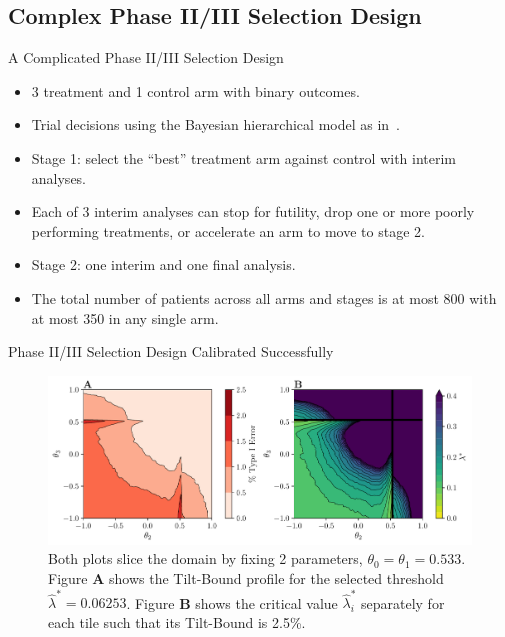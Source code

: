 
\subsection{Complex Phase II/III Selection Design}

\begin{frame}{A Complicated Phase II/III Selection Design}
\begin{itemize}
    \item 3 treatment and 1 control arm with binary outcomes.
    \item Trial decisions using the Bayesian hierarchical model 
        as in~\citet{berry:2013}.
    \item Stage 1: select the ``best'' treatment arm against control
        with interim analyses.
    \item Each of 3 interim analyses can stop for futility,
    drop one or more poorly performing treatments,
    or accelerate an arm to move to stage 2.
    \item Stage 2: one interim and one final analysis. 
    \item The total number of patients across
        all arms and stages is at most 800 with at most 350 in any single arm.
\end{itemize} 
\end{frame}

\begin{frame}{Phase II/III Selection Design Calibrated Successfully}
\begin{figure}
    \centering
    \includegraphics[width=\linewidth]{figs/lewis_tie_lam.pdf}
    \caption{%
    Both plots slice the domain by fixing 2 parameters, $\theta_0 = \theta_1 = 0.533$. Figure \textbf{A} shows the Tilt-Bound profile for the selected threshold $\hat{\lambda}^* = 0.06253$. Figure \textbf{B} shows the critical value $\hat{\lambda}^*_i$ separately for each tile such that its Tilt-Bound is 2.5\%.}
\end{figure} 
\end{frame}

